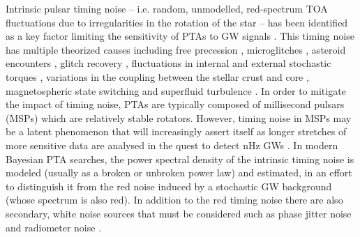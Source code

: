 \documentclass[fleqn,usenatbib,useAMS]{mnras}
\begin{document}
Intrinsic pulsar timing noise -- i.e.  random, unmodelled, red-spectrum TOA fluctuations due to irregularities in the rotation of the star -- has been identified as a key factor limiting the sensitivity of PTAs to GW signals \citep{Shannon2010,Lasky2015,Caballero2016,Goncharov2021}. This timing noise has multiple theorized causes including free precession \citep{free_precession_kerr,stairs_freeprecession}, microglitches \citep{Alessandro1995,Melatos2008,Espinoza2021}, asteroid encounters \citep{Shannon_2013,Brook_2014}, glitch recovery \citep{Johnston10,Hobbs2010glitch}, fluctuations in internal and external stochastic torques \citep{Cordes1981, 2006MNRAS.370L..76U,Antonelli2023}, variations in the coupling between the stellar crust and core \citep{Jones1990MNRAS.246..364J,Meyers2021,Melatos2023}, magnetospheric state switching \citep{magneto1,Lyne2010L,Stairs2019MNRAS.485.3230S} and superfluid turbulence \citep{Greenstein1970,Peralta2006,Melatos2014}. In order to mitigate the impact of timing noise, PTAs are typically composed of millisecond pulsars (MSPs) which are relatively stable rotators. However, timing noise in MSPs may be a latent phenomenon that will increasingly assert itself as longer stretches of more sensitive data are analysed in the quest to detect nHz GWs \citep{Shannon2010}. In modern Bayesian PTA searches, the power spectral density of the intrinsic timing noise is modeled (usually as a broken or unbroken power law) and estimated, in an effort to distinguish it from the red noise induced by a stochastic GW background (whose spectrum is also red). In addition to the red timing noise there are also secondary, white noise sources that must be considered such as phase jitter noise and radiometer noise \citep{Cordes2010,Lam2019,Parthasarathy2021}. \newline 
\end{document}
